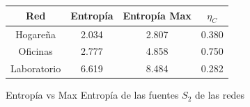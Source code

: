 \begin{figure}
	\centering
	\begin{tabular}{|c|c|c|c|}
		\hline
		Red & Entropía & Entropía Max & $\eta_{C}$ \\
		\hline
		Hogareña & 2.034 & 2.807 & 0.380 \\
		\hline
		Oficinas & 2.777 & 4.858 & 0.750 \\
		\hline
		Laboratorio & 6.619 & 8.484 & 0.282 \\
		\hline
	\end{tabular}
	\caption{Entropía vs Max Entropía de las fuentes $S_2$ de las redes}
\end{figure}
